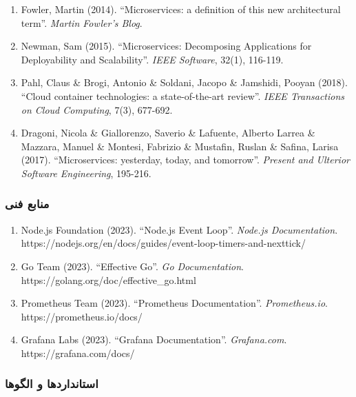 \documentclass[
]{article}
\begin{document}
\begin{enumerate}
\def\labelenumi{\arabic{enumi}.}
\setcounter{enumi}{10}
\item
  Fowler, Martin (2014). ``Microservices: a definition of this new
  architectural term''. \emph{Martin Fowler's Blog}.
\item
  Newman, Sam (2015). ``Microservices: Decomposing Applications for
  Deployability and Scalability''. \emph{IEEE Software}, 32(1), 116-119.
\item
  Pahl, Claus \& Brogi, Antonio \& Soldani, Jacopo \& Jamshidi, Pooyan
  (2018). ``Cloud container technologies: a state-of-the-art review''.
  \emph{IEEE Transactions on Cloud Computing}, 7(3), 677-692.
\item
  Dragoni, Nicola \& Giallorenzo, Saverio \& Lafuente, Alberto Larrea \&
  Mazzara, Manuel \& Montesi, Fabrizio \& Mustafin, Ruslan \& Safina,
  Larisa (2017). ``Microservices: yesterday, today, and tomorrow''.
  \emph{Present and Ulterior Software Engineering}, 195-216.
\end{enumerate}

\subsubsection{منابع
فنی}\label{ux645ux646ux627ux628ux639-ux641ux646ux6cc}

\begin{enumerate}
\def\labelenumi{\arabic{enumi}.}
\setcounter{enumi}{14}
\item
  Node.js Foundation (2023). ``Node.js Event Loop''. \emph{Node.js
  Documentation}.
  https://nodejs.org/en/docs/guides/event-loop-timers-and-nexttick/
\item
  Go Team (2023). ``Effective Go''. \emph{Go Documentation}.
  https://golang.org/doc/effective\_go.html
\item
  Prometheus Team (2023). ``Prometheus Documentation''.
  \emph{Prometheus.io}. https://prometheus.io/docs/
\item
  Grafana Labs (2023). ``Grafana Documentation''. \emph{Grafana.com}.
  https://grafana.com/docs/
\end{enumerate}

\subsubsection{استانداردها و
الگوها}\label{ux627ux633ux62aux627ux646ux62fux627ux631ux62fux647ux627-ux648-ux627ux644ux6afux648ux647ux627}
\end{document}
